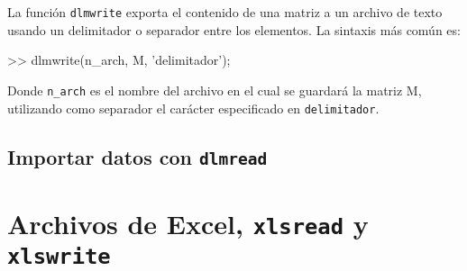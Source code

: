 La función \texttt{dlmwrite} exporta el contenido de una matriz a un
archivo de texto usando un delimitador o separador entre los elementos.
La sintaxis más común es:

\begin{matlab}
>> dlmwrite(n_arch, M, 'delimitador');
\end{matlab}

Donde \texttt{n\_arch} es el nombre del archivo en el cual se guardará
la matriz M, utilizando como separador el carácter especificado en \texttt{delimitador}.

\subsection{Importar datos con \texttt{dlmread}}

\section{Archivos de Excel, \texttt{xlsread} y \texttt{xlswrite}}



